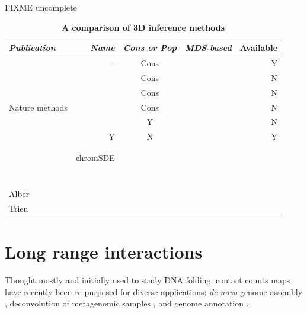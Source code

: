 \begin{table}[ht!]
\caption{\bf A comparison of 3D inference methods}{FIXME uncomplete}

\begin{center}
\begin{tabular}{lrcrr}
\hline
\emph{Publication} & \emph{Name} & \emph{Cons or Pop} & \emph{MDS-based} & Available \\
\hline
\citet{duan:three} & - & Cons & & Y \\
\citet{tanizawa:mapping} & & Cons & & N \\
\citet{ay:three-dimensional} & & Cons & & N\\
Nature methods & & Cons & & N\\
\citet{ben-elazar:spatial} & & Y & & N \\
\citet{varoquaux:statistical} & Y & N & & Y\\
\citet{bau:three-dimensional} & & & &\\
\citet{umbarger:three-dimensional} & & & &\\
\citet{zhang:inference} & chromSDE & & &\\
\citet{rousseau:three} & & & &\\
\citet{hu:bayesian} & & & &\\
\citet{kalhor:genome} & & & &\\
\citet{tokuda:dynamical} & & & &\\
\citet{wong:predictive} & & & &\\
\citet{gehlen:chromosome} & & & &\\
\citep{lesne:3d} & & & & \\
Alber & & & &\\
Trieu & & & & \\
\end{tabular}
\end{center}
\end{table}


\section{Long range interactions}


Thought mostly and initially used to study DNA folding, contact counts maps
have recently been re-purposed for diverse applications: \textit{de novo}
genome assembly \citep{burton:chromosome, kaplan:high-throughput},
deconvolution of metagenomic samples \citep{burton:species-level,
beitel:strain}, and genome annotation \citep{marie-nelly:filling,
varoquaux:accurate}.

